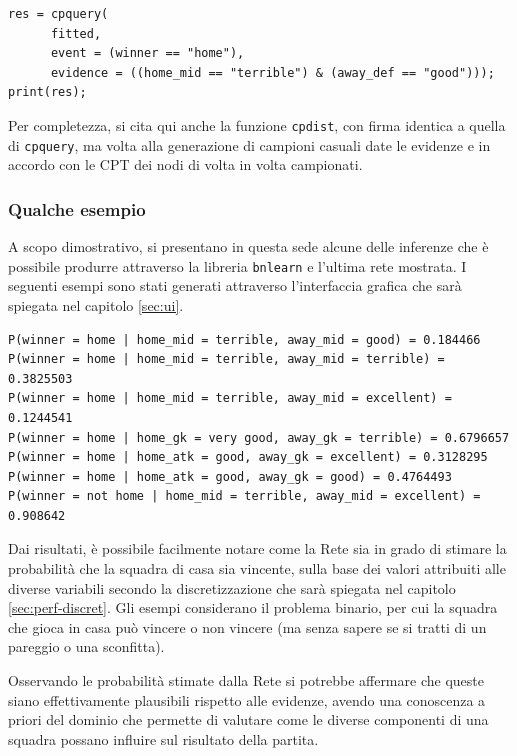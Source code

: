 \documentclass[hidelinks, 12pt]{article}
\begin{document}
\begin{verbatim}
res = cpquery(
      fitted,
      event = (winner == "home"),
      evidence = ((home_mid == "terrible") & (away_def == "good")));
print(res);
\end{verbatim}

\vspace{2ex}

Per completezza, si cita qui anche la funzione \texttt{cpdist}, con firma identica a quella di \texttt{cpquery}, ma volta alla generazione di campioni casuali date le evidenze e in accordo con le CPT dei nodi di volta in volta campionati.


\subsubsection{Qualche esempio}
\label{sec:inference-examples}

A scopo dimostrativo, si presentano in questa sede alcune delle inferenze che è possibile produrre attraverso la libreria \texttt{bnlearn} e l'ultima rete mostrata. I seguenti esempi sono stati generati attraverso l'interfaccia grafica che sarà spiegata nel capitolo \ref{sec:ui}.

\begin{verbatim}
P(winner = home | home_mid = terrible, away_mid = good) = 0.184466
P(winner = home | home_mid = terrible, away_mid = terrible) = 0.3825503
P(winner = home | home_mid = terrible, away_mid = excellent) = 0.1244541
P(winner = home | home_gk = very good, away_gk = terrible) = 0.6796657
P(winner = home | home_atk = good, away_gk = excellent) = 0.3128295
P(winner = home | home_atk = good, away_gk = good) = 0.4764493
P(winner = not home | home_mid = terrible, away_mid = excellent) = 0.908642
\end{verbatim}

Dai risultati, è possibile facilmente notare come la Rete sia in grado di stimare la probabilità che la squadra di casa sia vincente, sulla base dei valori attribuiti alle diverse variabili secondo la discretizzazione che sarà spiegata nel capitolo \ref{sec:perf-discret}. Gli esempi considerano il problema binario, per cui la squadra che gioca in casa può vincere o non vincere (ma senza sapere se si tratti di un pareggio o una sconfitta).

Osservando le probabilità stimate dalla Rete si potrebbe affermare che queste siano effettivamente plausibili rispetto alle evidenze, avendo una conoscenza a priori del dominio che permette di valutare come le diverse componenti di una squadra possano influire sul risultato della partita.
\end{document}
